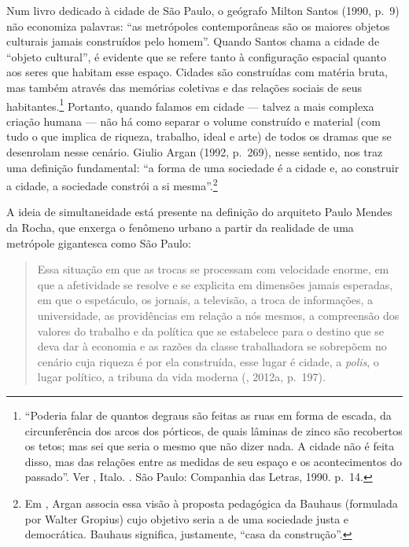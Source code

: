 Num livro dedicado à cidade de São Paulo, o geógrafo Milton Santos
(1990, p.~9) não economiza palavras: ``as metrópoles contemporâneas são
os maiores objetos culturais jamais construídos pelo homem''. Quando
Santos chama a cidade de ``objeto cultural'', é evidente que se refere
tanto à configuração espacial quanto aos seres que habitam esse espaço.
Cidades são construídas com matéria bruta, mas também através das
memórias coletivas e das relações sociais de seus habitantes.\footnote{``Poderia falar de quantos degraus são feitas as ruas em forma de escada, da circunferência dos arcos dos pórticos, de quais lâminas de zinco são recobertos os tetos; mas sei que seria o mesmo que não dizer nada. A cidade não é feita disso, mas das relações entre as medidas de seu espaço e os acontecimentos do passado''. Ver , Italo. {}. São Paulo: Companhia das Letras, 1990. p.~14.} Portanto,
quando falamos em cidade --- talvez a mais complexa criação humana --- não
há como separar o volume construído e material (com tudo o que implica
de riqueza, trabalho, ideal e arte) de todos os dramas que se desenrolam
nesse cenário. Giulio Argan (1992, p.~269), nesse sentido, nos traz uma definição
fundamental: ``a forma de uma sociedade é a cidade e, ao construir a
cidade, a sociedade constrói a si mesma''.\footnote{Em
  {}, Argan associa essa visão à proposta pedagógica da
  Bauhaus (formulada por Walter Gropius) cujo objetivo seria a
  {} de uma sociedade justa e democrática. Bauhaus
  significa, justamente, ``casa da construção''.}

A ideia de simultaneidade está presente na definição do arquiteto Paulo
Mendes da Rocha, que enxerga o fenômeno urbano a
partir da realidade de uma metrópole gigantesca como São Paulo:

\begin{quote}
Essa situação em que as trocas se processam com velocidade enorme, em
que a afetividade se resolve e se explicita em dimensões jamais
esperadas, em que o espetáculo, os jornais, a televisão, a troca de
informações, a universidade, as providências em relação a nós mesmos, a
compreensão dos valores do trabalho e da política que se estabelece para
o destino que se deva dar à economia e as razões da classe trabalhadora
se sobrepõem no cenário cuja riqueza é por ela construída, esse lugar é
cidade, a \emph{polis}, o lugar político, a tribuna da vida moderna (, 2012a, p.~197).
\end{quote}

